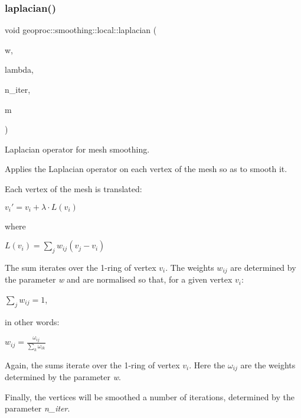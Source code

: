 \subsubsection{\texorpdfstring{laplacian()}{laplacian()}\hspace{0.1cm}{\footnotesize\ttfamily [1/2]}}
{\footnotesize\ttfamily void geoproc\+::smoothing\+::local\+::laplacian (\begin{DoxyParamCaption}\item[{const \hyperlink{namespacegeoproc_1_1smoothing_a76e43f405426c150569712512de58028}{smooth\+\_\+weight} \&}]{w,  }\item[{float}]{lambda,  }\item[{size\+\_\+t}]{n\+\_\+iter,  }\item[{\hyperlink{classgeoproc_1_1TriangleMesh}{Triangle\+Mesh} \&}]{m }\end{DoxyParamCaption})}



Laplacian operator for mesh smoothing. 

Applies the Laplacian operator on each vertex of the mesh so as to smooth it.

Each vertex of the mesh is translated\+:

$ v_i' = v_i + \lambda \cdot L(v_i) $

where

$ L(v_i) = \sum_{j} w_{ij}(v_j - v_i) $

The sum iterates over the 1-\/ring of vertex $v_i$. The weights $ w_{ij} $ are determined by the parameter {\itshape w} and are normalised so that, for a given vertex $v_i$\+:

$ \sum_{j} w_{ij} = 1 $,

in other words\+:

$ w_{ij} = \frac{ \omega_{ij} }{ \sum_{k} \omega_{ik} } $

Again, the sums iterate over the 1-\/ring of vertex $v_i$. Here the $ \omega_{ij} $ are the weights determined by the parameter {\itshape w}.

Finally, the vertices will be smoothed a number of iterations, determined by the parameter {\itshape n\+\_\+iter}.


